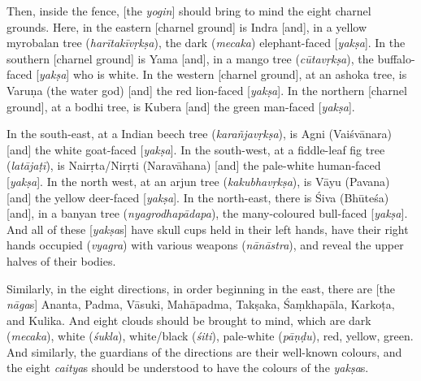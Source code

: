 \documentclass[naipra.tex]{subfiles}
\begin{document}
Then, inside the fence, [the \emph{yogin}] should bring to mind the eight charnel grounds.
Here, in the eastern [charnel ground] is Indra [and], in a yellow myrobalan tree (\emph{harītakīvṛkṣa}), the dark (\emph{mecaka}) elephant-faced [\emph{yakṣa}].
In the southern [charnel ground] is Yama [and], in a mango tree (\emph{cūtavṛkṣa}), the buffalo-faced [\emph{yakṣa}] who is white.
In the western [charnel ground], at an ashoka tree, is Varuṇa (the water god) [and] the red lion-faced [\emph{yakṣa}].
In the northern [charnel ground], at a bodhi tree, is Kubera [and] the green man-faced [\emph{yakṣa}]. 

In the south-east, at a Indian beech tree (\emph{karañjavṛkṣa}), is Agni (Vaiśvānara) [and] the white goat-faced [\emph{yakṣa}]. %
In the south-west, at a fiddle-leaf fig tree (\emph{latājaṭī}), is Nairṛta/Nirṛti (Naravāhana) [and] the pale-white human-faced [\emph{yakṣa}]. %
In the north west, at an arjun tree (\emph{kakubhavṛkṣa}), is Vāyu (Pavana) [and] the yellow deer-faced [\emph{yakṣa}]. %
In the north-east, there is Śiva (Bhūteśa) [and], in a banyan tree (\emph{nyagrodhapādapa}), the many-coloured bull-faced [\emph{yakṣa}]. %
And all of these [\emph{yakṣa}s] have skull cups held in their left hands, have their right hands occupied (\emph{vyagra}) with various weapons (\emph{nānāstra}), and reveal the upper halves of their bodies.

Similarly, in the eight directions, in order beginning in the east, there are [the \emph{nāga}s] Ananta, Padma, Vāsuki, Mahāpadma, Takṣaka, Śaṃkhapāla, Karkoṭa, and Kulika.
And eight clouds should be brought to mind, which are dark (\emph{mecaka}), white (\emph{śukla}), white/black (\emph{śiti}), pale-white (\emph{pāṇḍu}), red, yellow, green. 
And similarly, the guardians of the directions are their well-known colours, and the eight \emph{caitya}s should be understood to have the colours of the \emph{yakṣa}s. 
\end{document}
